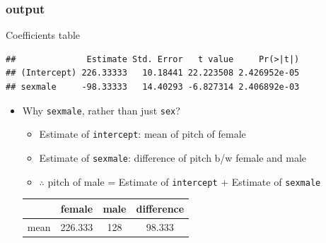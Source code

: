 \documentclass[10p]{beamer}\usepackage[]{graphicx}\usepackage[]{color}
\makeatletter
\newenvironment{kframe}{%
 \def\at@end@of@kframe{}%
 \ifinner\ifhmode%
  \def\at@end@of@kframe{\end{minipage}}%
  \begin{minipage}{\columnwidth}%
 \fi\fi%
 \def\FrameCommand##1{\hskip\@totalleftmargin \hskip-\fboxsep
 \colorbox{shadecolor}{##1}\hskip-\fboxsep
     \hskip-\linewidth \hskip-\@totalleftmargin \hskip\columnwidth}%
 \MakeFramed {\advance\hsize-\width
   \@totalleftmargin\z@ \linewidth\hsize
   \@setminipage}}%
 {\par\unskip\endMakeFramed%
 \at@end@of@kframe}
\newenvironment{knitrout}{}{} %
\makeatother
\begin{document}
\begin{frame}[fragile]
\frametitle{output}
Coefficients table
\begin{knitrout}\scriptsize
{}\color{fgcolor}\begin{kframe}
\begin{verbatim}
##              Estimate Std. Error   t value     Pr(>|t|)
## (Intercept) 226.33333   10.18441 22.223508 2.426952e-05
## sexmale     -98.33333   14.40293 -6.827314 2.406892e-03
\end{verbatim}
\end{kframe}
\end{knitrout}
\begin{itemize}
\item Why \texttt{sexmale}, rather than just \texttt{sex}?
	\begin{itemize}
	\item Estimate of \texttt{intercept}: mean of pitch of female 
	\item Estimate of \texttt{sexmale}: difference of pitch b/w female and male
	\item $\therefore$ pitch of male = Estimate of \texttt{intercept} + Estimate of \texttt{sexmale}
	\end{itemize}

\vspace{9pt}
\begin{center}
\begin{tabular}{cccc}

\toprule
& female & male & difference \\
\midrule
mean & 226.333 & 128 & 98.333 \\
\bottomrule
\end{tabular}
\end{center}
\end{itemize}
\end{frame}
\end{document}
